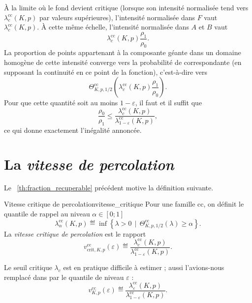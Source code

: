 \begin{Preuve}
À la limite où le fond devient critique (lorsque son intensité normalisée tend vers $\lambda_c^{\mathrm{cc}}(K,p)$ par valeurs supérieures), l'intensité normalisée dans $F$ vaut $\lambda_c^{\mathrm{cc}}(K,p)$. À cette même échelle, l'intensité normalisée dans $A$ et $B$ vaut
\[
    \lambda_c^{\mathrm{cc}}(K,p)\frac{\rho_1}{\rho_0}.
\]
La proportion de points appartenant à la composante géante dans un domaine homogène de cette intensité converge vers la probabilité de  correspondante (en supposant la continuité en ce point de la fonction), c'est-à-dire vers
\[
    \Theta^{\mathrm{cc}}_{K,p,1/2}\left(
        \lambda_c^{\mathrm{cc}}(K,p)\frac{\rho_1}{\rho_0}
    \right).
\]
Pour que cette quantité soit au moins $1-\varepsilon$, il faut et il suffit que
\[
    \frac{\rho_0}{\rho_1}
    \le
    \frac{\lambda_c^{\mathrm{cc}}(K,p)}
         {\lambda^{\mathrm{cc}}_{1-\varepsilon}(K,p)},
\]
ce qui donne exactement l'inégalité annoncée.
\end{Preuve}


\section{La \emph{vitesse de percolation}}

Le \Th~\ref{th:fraction_recuperable} précédent motive la définition suivante.

\begin{Definition}{Vitesse critique de percolation}{vitesse_critique}
Pour une famille $\mathrm{cc}$, on définit le quantile de rappel au niveau $\alpha \in [ 0 ; 1]$
\[
    \lambda^{\mathrm{cc}}_{\alpha}(K,p)
    \eqdef
    \inf\left\{
        \lambda>0 \, \mid \,
        \Theta^{\mathrm{cc}}_{K,p,1/2}(\lambda)
        \ge \alpha
    \right\}.
\]
La \emph{vitesse critique de percolation} est le rapport
\[
\boxed{
    v^{\mathrm{cc}}_{\mathrm{crit},K,p}(\varepsilon)
    \eqdef
    \frac{
        \lambda_c^{\mathrm{cc}}(K,p)
    }{
        \lambda^{\mathrm{cc}}_{1-\varepsilon}(K,p)
    }.
    }
\]
\end{Definition}


Le seuil critique $\lambda_c$ est en pratique difficile à estimer ; aussi l'avions-nous remplacé dans \cite{BibiIstambul} par le quantile de niveau $\varepsilon$ :
\begin{equation}
\boxed{
    v^{\mathrm{cc}}_{K,p}(\varepsilon)
    \eqdef
    \frac{
        \lambda_\varepsilon^{\mathrm{cc}}(K,p)
    }{
        \lambda_{1-\varepsilon}^{\mathrm{cc}}(K,p)
    }.
}
\end{equation}


